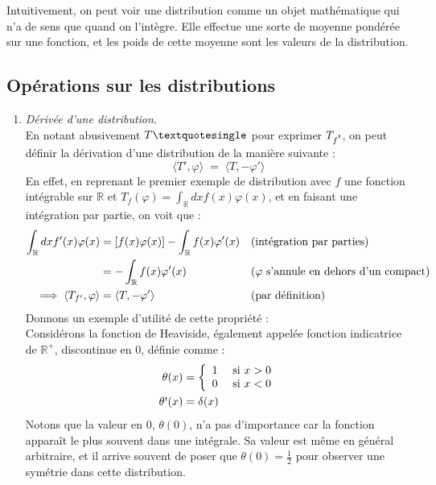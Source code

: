 \documentclass[../notesdecours.tex]{subfiles}
\begin{document}
\begin{description}
        Intuitivement, on peut voir une distribution comme un objet mathématique qui n'a de sens que quand on l'intègre. Elle effectue une sorte de moyenne pondérée sur une fonction, et les poids de cette moyenne sont les valeurs de la distribution.
\end{description}

\subsection{Opérations sur les distributions}

\begin{enumerate}
    \item \textit{Dérivée d'une distribution}.  \\
    En notant abusivement $T \textquotesingle$ pour exprimer $T_{f \mbox{\textquotesingle}}$, on peut définir la dérivation d'une distribution de la manière suivante : \\
    $$ \langle T', \varphi \rangle \; = \; \langle T, -\varphi' \rangle $$
    En effet, en reprenant le premier exemple de distribution avec $f$ une fonction intégrable sur $\mathbb{R}$ et $T_f(\varphi) = \int_{\mathbb{R}} dx f(x) \varphi(x)$, 
    et en faisant une intégration par partie, on voit que : \\
    \begin{align}
        \int_{\mathbb{R}} dx f'(x) \varphi(x) &= \left[ f(x)\varphi(x)\right] - \int_\mathbb{R} f(x) \varphi'(x) && \text{(intégration par parties)}\notag  \\
        &= -\int_\mathbb{R} f(x) \varphi'(x) && \text{($\varphi$ s'annule en dehors d'un compact)}\notag  \\
        \implies \langle T_{f'}, \varphi\rangle  &= \langle T, - \varphi' \rangle  && \text{(par définition)} \notag 
    \end{align}
    Donnons un exemple d'utilité de cette propriété : \\
    Considérons la fonction de Heaviside, également appelée fonction indicatrice de $\mathbb{R}^+$, discontinue en $0$, définie comme : 
    \begin{align}
    \label{fonction de Heaviside}
        \theta (x) &= \left\lbrace \begin{array}{lll}
                1 \quad \mbox{ si $x> 0$} \\
                0 \quad \mbox{ si $x< 0$}
                \end{array}\right. \notag \\
        \theta \mbox{\textquotesingle} (x) &= \delta (x)
    \end{align}
    Notons que la valeur en $0$, $\theta (0)$, n'a pas d'importance car la fonction apparaît le plus souvent dans une intégrale. Sa valeur est même en général arbitraire, et il arrive souvent de poser que $\theta (0) = \frac{1}{2}$ pour observer une symétrie dans cette distribution. \\


\end{enumerate}
\end{document}
